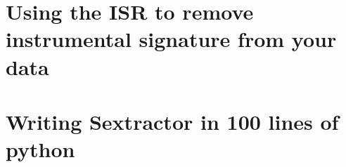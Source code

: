 
\section{Using the ISR to remove instrumental signature from your data}

\section{Writing Sextractor in 100 lines of python}
 
